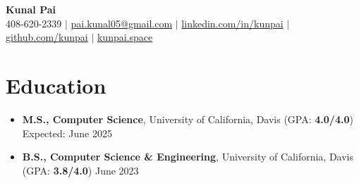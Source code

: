 \documentclass[letterpaper,10pt]{article}
\makeatletter
\newcommand{\resumeSubheading}[4]{
\vspace{-1pt}\item
  \begin{tabular*}{0.97\textwidth}[t]{l@{\extracolsep{\fill}}r}
    \textbf{#1} & #2 \\
    \textit{#3} & \textit{#4} \\
  \end{tabular*}\vspace{-7pt}
}
\newcommand{\resumeSubHeadingList}{\begin{itemize}[leftmargin=0.15in, label={}]}
\newcommand{\resumeSubHeadingListEnd}{\end{itemize}}
\makeatother
\begin{document}
\begin{center}
  \textbf{\Huge Kunal Pai} \\
  \small 408-620-2339 $|$ \href{mailto:pai.kunal05@gmail.com}{pai.kunal05@gmail.com} $|$ 
  \href{https://linkedin.com/in/kunpai}{linkedin.com/in/kunpai} $|$
  \href{https://github.com/kunpai}{github.com/kunpai} $|$
  \href{https://www.kunpai.space}{kunpai.space}
\end{center}

\section{Education}
\begin{itemize}[leftmargin=0.15in, label={}]
    \item \textbf{M.S., Computer Science}, University of California, Davis (GPA: \textbf{4.0/4.0}) \hfill Expected: June 2025
    \item \textbf{B.S., Computer Science \& Engineering}, University of California, Davis (GPA: \textbf{3.8/4.0}) \hfill June 2023
  \end{itemize} %

\end{document}
